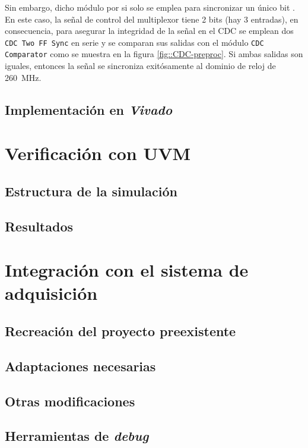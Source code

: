 \documentclass[../../main.tex]{subfiles}
\begin{document}
Sin embargo, dicho módulo por si solo se emplea para sincronizar un único bit . En este caso, la señal de control del multiplexor tiene 2 bits (hay 3 entradas), en consecuencia, para asegurar la integridad de la señal en el CDC se emplean dos \texttt{CDC Two FF Sync} en serie y se comparan sus salidas con el módulo \texttt{CDC Comparator} como se muestra en la figura \ref{fig::CDC-preproc}. Si ambas salidas son iguales, entonces la señal se sincroniza exitósamente al dominio de reloj de 260~MHz.


\subsection{Implementación en \textit{Vivado}}




\section{Verificación con UVM}
\subsection{Estructura de la simulación}
\subsection{Resultados}

\section{Integración con el sistema de adquisición}

\subsection{Recreación del proyecto preexistente}

\subsection{Adaptaciones necesarias}
\subsection{Otras modificaciones}
\subsection{Herramientas de \textit{debug}}
\end{document}
